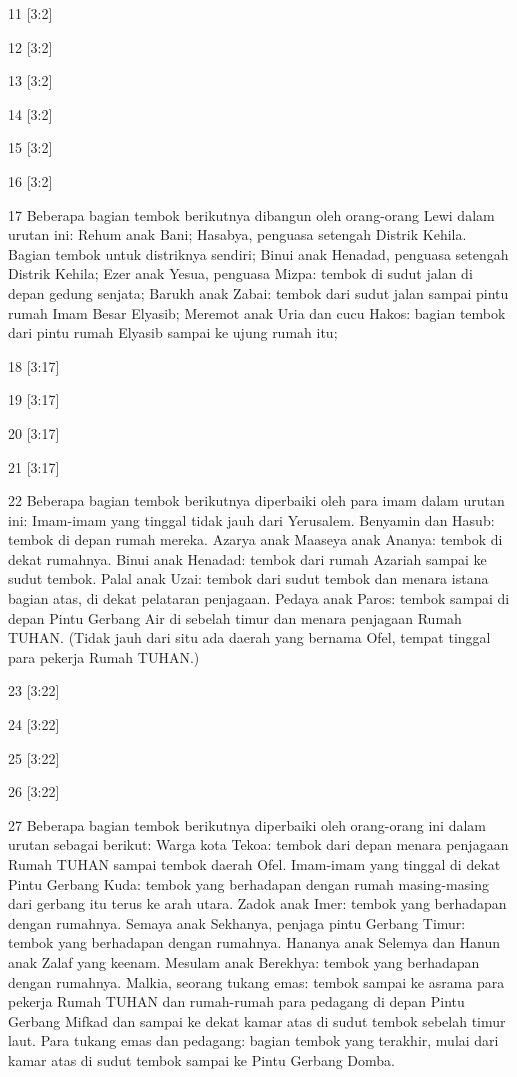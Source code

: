 \par 11 [3:2]
\par 12 [3:2]
\par 13 [3:2]
\par 14 [3:2]
\par 15 [3:2]
\par 16 [3:2]
\par 17 Beberapa bagian tembok berikutnya dibangun oleh orang-orang Lewi dalam urutan ini: Rehum anak Bani; Hasabya, penguasa setengah Distrik Kehila. Bagian tembok untuk distriknya sendiri; Binui anak Henadad, penguasa setengah Distrik Kehila; Ezer anak Yesua, penguasa Mizpa: tembok di sudut jalan di depan gedung senjata; Barukh anak Zabai: tembok dari sudut jalan sampai pintu rumah Imam Besar Elyasib; Meremot anak Uria dan cucu Hakos: bagian tembok dari pintu rumah Elyasib sampai ke ujung rumah itu;
\par 18 [3:17]
\par 19 [3:17]
\par 20 [3:17]
\par 21 [3:17]
\par 22 Beberapa bagian tembok berikutnya diperbaiki oleh para imam dalam urutan ini: Imam-imam yang tinggal tidak jauh dari Yerusalem. Benyamin dan Hasub: tembok di depan rumah mereka. Azarya anak Maaseya anak Ananya: tembok di dekat rumahnya. Binui anak Henadad: tembok dari rumah Azariah sampai ke sudut tembok. Palal anak Uzai: tembok dari sudut tembok dan menara istana bagian atas, di dekat pelataran penjagaan. Pedaya anak Paros: tembok sampai di depan Pintu Gerbang Air di sebelah timur dan menara penjagaan Rumah TUHAN. (Tidak jauh dari situ ada daerah yang bernama Ofel, tempat tinggal para pekerja Rumah TUHAN.)
\par 23 [3:22]
\par 24 [3:22]
\par 25 [3:22]
\par 26 [3:22]
\par 27 Beberapa bagian tembok berikutnya diperbaiki oleh orang-orang ini dalam urutan sebagai berikut: Warga kota Tekoa: tembok dari depan menara penjagaan Rumah TUHAN sampai tembok daerah Ofel. Imam-imam yang tinggal di dekat Pintu Gerbang Kuda: tembok yang berhadapan dengan rumah masing-masing dari gerbang itu terus ke arah utara. Zadok anak Imer: tembok yang berhadapan dengan rumahnya. Semaya anak Sekhanya, penjaga pintu Gerbang Timur: tembok yang berhadapan dengan rumahnya. Hananya anak Selemya dan Hanun anak Zalaf yang keenam. Mesulam anak Berekhya: tembok yang berhadapan dengan rumahnya. Malkia, seorang tukang emas: tembok sampai ke asrama para pekerja Rumah TUHAN dan rumah-rumah para pedagang di depan Pintu Gerbang Mifkad dan sampai ke dekat kamar atas di sudut tembok sebelah timur laut. Para tukang emas dan pedagang: bagian tembok yang terakhir, mulai dari kamar atas di sudut tembok sampai ke Pintu Gerbang Domba.

